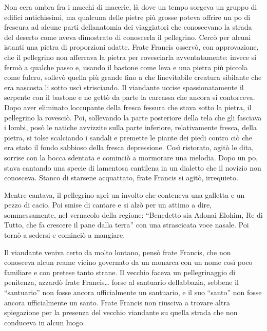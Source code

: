 Non c\textquotesingle era ombra fra i mucchi di macerie, là dove un
tempo sorgeva un gruppo di edifici antichissimi, ma qualcuna delle
pietre più grosse poteva offrire un po\textquotesingle{} di frescura ad
alcune parti dell\textquotesingle anatomia dei viaggiatori che
conoscevano la strada del deserto come aveva dimostrato di conoscerla il
pellegrino. Cercò per alcuni istanti una pietra di proporzioni adatte.
Frate Francis osservò, con approvazione, che il pellegrino non afferrava
la pietra per rovesciarla avventatamente: invece si fermò a qualche
passo e, usando il bastone come leva e una pietra più piccola come
fulcro, sollevò quella più grande fino a che
l\textquotesingle inevitabile creatura sibilante che era nascosta li
sotto uscì strisciando. Il viandante uccise spassionatamente il serpente
con il bastone e ne gettò da parte la carcassa che ancora si contorceva.
Dopo aver eliminato l\textquotesingle occupante della fresca fessura che
stava sotto la pietra, il pellegrino la rovesciò. Poi, sollevando la
parte posteriore della tela che gli fasciava i lombi, posò le natiche
avvizzite sulla parte inferiore, relativamente fresca, della pietra, si
tolse scalciando i sandali e premette le piante dei piedi contro ciò che
era stato il fondo sabbioso della fresca depressione. Così ristorato,
agitò le dita, sorrise con la bocca sdentata e cominciò a mormorare una
melodia. Dopo un po\textquotesingle, stava cantando una specie di
lamentosa cantilena in un dialetto che il novizio non conosceva. Stanco
di starsene acquattato, frate Francis si agitò, irrequieto.

Mentre cantava, il pellegrino aprì un involto che conteneva una galletta
e un pezzo di cacio. Poi smise di cantare e si alzò per un attimo a
dire, sommessamente, nel vernacolo della regione: ``Benedetto sia Adonai
Elohim, Re di Tutto, che fa crescere il pane dalla terra'' con una
strascicata voce nasale. Poi tornò a sedersi e cominciò a mangiare.

Il viandante veniva certo da molto lontano, pensò frate Francis, che non
conosceva alcun reame vicino governato da un monarca con un nome così
poco familiare e con pretese tanto strane. Il vecchio faceva un
pellegrinaggio di penitenza, azzardò frate Francis\ldots{} forse al
santuario dell\textquotesingle abbazia, sebbene il ``santuario'' non
fosse ancora ufficialmente un santuario, e il suo ``santo'' non fosse
ancora ufficialmente un santo. Frate Francis non riusciva a trovare
altra spiegazione per la presenza del vecchio viandante su quella strada
che non conduceva in alcun luogo.

